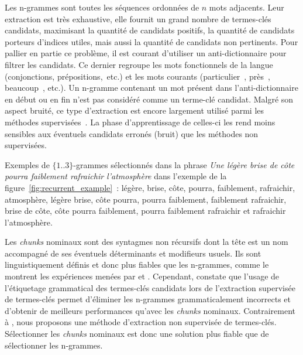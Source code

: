     Les n-grammes sont toutes les séquences ordonnées de $n$ mots adjacents. Leur extraction est très exhaustive, elle fournit un
    grand nombre de termes-clés candidats, maximisant la quantité de candidats
    positifs, la quantité de candidats porteurs d'indices utiles, mais aussi la
    quantité de candidats non pertinents. Pour pallier en partie ce problème, il
    est courant d'utiliser un anti-dictionnaire pour filtrer les candidats. Ce
    dernier regroupe les mots fonctionnels de la langue (conjonctions,
    prépositions,~etc.) et les mots courants (\og particulier~\fg, \og près~\fg,
    \og beaucoup~\fg, etc.). Un n-gramme contenant un mot présent dans
    l'anti-dictionnaire en début ou en fin n'est pas considéré comme un
    terme-clé candidat. Malgré son aspect bruité, ce type d'extraction est
    encore largement utilisé parmi les méthodes
    supervisées~\cite{witten1999kea,turney1999learningalgorithms,hulth2003keywordextraction}.
    La phase d'apprentissage de celles-ci les rend moins sensibles aux éventuels
    candidats erronés (bruit) que les méthodes non supervisées.

    Exemples de $\{1..3\}$-grammes sélectionnés dans la phrase \textit{\og{}Une
    légère brise de côte pourra faiblement rafraichir l'atmosphère\fg{}} dans
    l'exemple de la figure~\ref{fig:recurrent_example}~: \og{}légère\fg{}, \og{}brise\fg{},
    \og{}côte\fg{}, \og{}pourra\fg{}, \og{}faiblement\fg{},
    \og{}rafraichir\fg{}, \og{}atmosphère\fg{}, \og{}légère brise\fg{},
    \og{}côte pourra\fg{}, \og{}pourra faiblement\fg{}, \og{}faiblement
    rafraichir\fg{}, \og{}brise de côte\fg{}, \og{}côte pourra faiblement\fg{},
    \og{}pourra faiblement rafraichir\fg{} et \og{}rafraichir
    l'atmosphère\fg{}.

    Les \textit{chunks} nominaux sont des syntagmes non récursifs dont la tête
    est un nom accompagné de ses éventuels déterminants et modifieurs usuels.
    Ils sont linguistiquement définis et donc plus fiables que les n-grammes,
    comme le montrent les expériences menées par
     et . Cependant, 
    constate que l'usage de l'étiquetage grammatical des termes-clés candidats
    lors de l'extraction supervisée de termes-clés permet d'éliminer les
    n-grammes grammaticalement incorrects et d'obtenir de meilleurs performances
    qu'avec les \textit{chunks} nominaux. Contrairement à
    , nous proposons une méthode
    d'extraction non supervisée de termes-clés. Sélectionner les \textit{chunks}
    nominaux est donc une solution plus fiable que de sélectionner les
    n-grammes.


